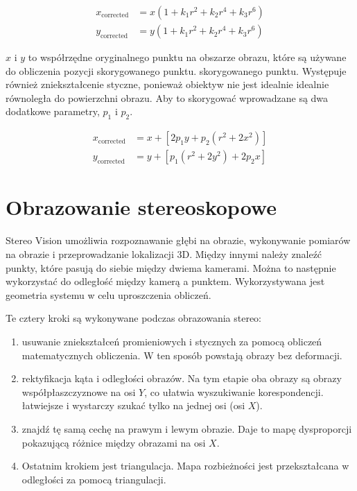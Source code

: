 \documentclass[magisterska]{pracadypl}
\begin{document}
\begin{align*}
x_{\text{corrected}} &= x \left(1 + k_1 r^2 + k_2 r^4 + k_3 r^6 \right) \\
y_{\text{corrected}} &= y \left(1 + k_1 r^2 + k_2 r^4 + k_3 r^6 \right)
\end{align*}

$x$ i $y$ to współrzędne oryginalnego punktu na obszarze obrazu, które są używane do obliczenia pozycji skorygowanego punktu.
skorygowanego punktu.
Występuje również zniekształcenie styczne, ponieważ obiektyw nie jest idealnie
idealnie równoległa do powierzchni obrazu. Aby to skorygować
wprowadzane są dwa dodatkowe parametry, $p_1$ i $p_2$.

\begin{align*}
x_{\text{corrected}} &= x + \left[2p_1 y + p_2 (r^2 + 2x^2)\right] \\
y_{\text{corrected}} &= y + \left[p_1 (r^2 + 2y^2) + 2p_2 x\right]
\end{align*}


\section{Obrazowanie stereoskopowe}

Stereo Vision umożliwia rozpoznawanie głębi na obrazie, wykonywanie pomiarów na obrazie
i przeprowadzanie lokalizacji 3D. Między innymi należy znaleźć punkty, które pasują do siebie między dwiema kamerami. Można to następnie wykorzystać do odległość między kamerą a punktem. Wykorzystywana jest geometria systemu w celu uproszczenia obliczeń.

Te cztery kroki są wykonywane podczas obrazowania stereo:

\begin{enumerate}
  \item usuwanie zniekształceń promieniowych i stycznych za pomocą obliczeń matematycznych
obliczenia. W ten sposób powstają obrazy bez deformacji.
  \item rektyfikacja kąta i odległości obrazów. Na tym etapie oba obrazy są
obrazy współpłaszczyznowe na osi $Y$, co ułatwia wyszukiwanie korespondencji.
łatwiejsze i wystarczy szukać tylko na jednej osi (osi $X$).
  \item znajdź tę samą cechę na prawym i lewym obrazie. Daje to mapę dysproporcji pokazującą różnice między obrazami na osi $X$.
  \item Ostatnim krokiem jest triangulacja. Mapa rozbieżności jest przekształcana w odległości za pomocą triangulacji.
\end{enumerate}
\end{document}
